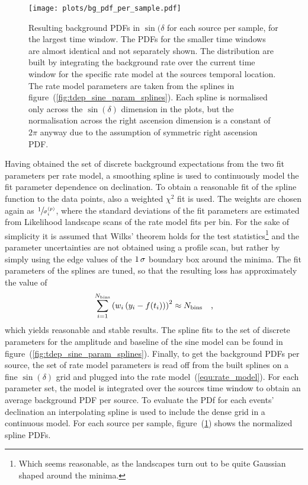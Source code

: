 \begin{figure}[htbp]
  \centering
  \texttt{[image: plots/bg\_pdf\_per\_sample.pdf]}
  \caption[Background PDFs per source per sample for the time-dependent analysis]{
    Resulting background PDFs in $\sin(\delta$ for each source per sample, for the largest time window.
    The PDFs for the smaller time windows are almost identical and not separately shown.
    The distribution are built by integrating the background rate over the current time window for the specific rate model at the sources temporal location.
    The rate model parameters are taken from the splines in figure~(\ref{fig:tdep_sine_param_splines}).
    Each spline is normalised only across the $\sin(\delta)$ dimension in the plots, but the normalisation across the right ascension dimension is a constant of $2\pi$ anyway due to the assumption of symmetric right ascension PDF.
  }
  \label{fig:tdep_bg_pdf_per_sample}
\end{figure}

Having obtained the set of discrete background expectations from the two fit parameters per rate model, a smoothing spline is used to continuously model the fit parameter dependence on declination.
To obtain a reasonable fit of the spline function to the data points, also a weighted $\chi^2$ fit is used.
The weights are chosen again as $\sfrac{1}{\sigma_i^{(p)}}$, where the standard deviations of the fit parameters are estimated from Likelihood landscape scans of the rate model fits per bin.
For the sake of simplicity it is assumed that Wilks' theorem holds for the test statistics\footnote{Which seems reasonable, as the landscapes turn out to be quite Gaussian shaped around the minima.} and the parameter uncertainties are not obtained using a profile scan, but rather by simply using the edge values of the $\num{1}\,\sigma$ boundary box around the minima.
The fit parameters of the splines are tuned, so that the resulting loss has approximately the value of
\begin{equation}
  \sum_{i=1}^{N_\text{bins}} \left(w_i\left(y_i - f(t_i)\right)\right)^2
  \approx N_\text{bins}
  \quad\text{,}
\end{equation}
which yields reasonable and stable results.
The spline fits to the set of discrete parameters for the amplitude and baseline of the sine model can be found in figure~(\ref{fig:tdep_sine_param_splines}).
Finally, to get the background PDFs per source, the set of rate model parameters is read off from the built splines on a fine $\sin(\delta)$ grid and plugged into the rate model~(\ref{equ:rate_model}).
For each parameter set, the model is integrated over the sources time window to obtain an average background PDF per source.
To evaluate the PDf for each events' declination an interpolating spline is used to include the dense grid in a continuous model.
For each source per sample, figure~(\ref{fig:tdep_bg_pdf_per_sample}) shows the normalized spline PDFs.


